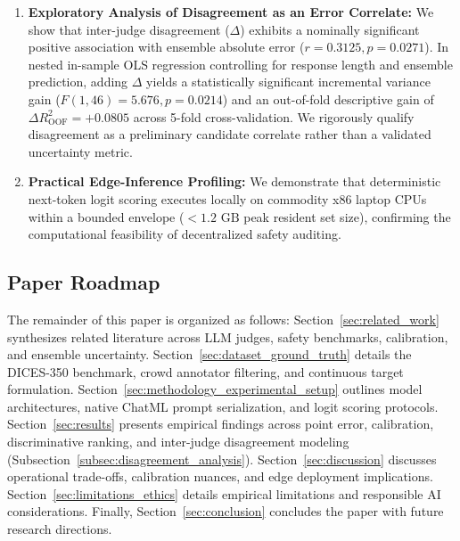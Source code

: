\begin{enumerate}
    \item \textbf{Exploratory Analysis of Disagreement as an Error Correlate:} We show that inter-judge disagreement ($\Delta$) exhibits a nominally significant positive association with ensemble absolute error ($r = 0.3125, p = 0.0271$). In nested in-sample OLS regression controlling for response length and ensemble prediction, adding $\Delta$ yields a statistically significant incremental variance gain ($F(1, 46) = 5.676, p = 0.0214$) and an out-of-fold descriptive gain of $\Delta R^2_{\text{OOF}} = +0.0805$ across 5-fold cross-validation. We rigorously qualify disagreement as a preliminary candidate correlate rather than a validated uncertainty metric.
    \item \textbf{Practical Edge-Inference Profiling:} We demonstrate that deterministic next-token logit scoring executes locally on commodity x86 laptop CPUs within a bounded envelope ($< 1.2\text{ GB}$ peak resident set size), confirming the computational feasibility of decentralized safety auditing.
\end{enumerate}

\subsection{Paper Roadmap}
\label{sec:roadmap}

The remainder of this paper is organized as follows: Section~\ref{sec:related_work} synthesizes related literature across LLM judges, safety benchmarks, calibration, and ensemble uncertainty. Section~\ref{sec:dataset_ground_truth} details the DICES-350 benchmark, crowd annotator filtering, and continuous target formulation. Section~\ref{sec:methodology_experimental_setup} outlines model architectures, native ChatML prompt serialization, and logit scoring protocols. Section~\ref{sec:results} presents empirical findings across point error, calibration, discriminative ranking, and inter-judge disagreement modeling (Subsection~\ref{subsec:disagreement_analysis}). Section~\ref{sec:discussion} discusses operational trade-offs, calibration nuances, and edge deployment implications. Section~\ref{sec:limitations_ethics} details empirical limitations and responsible AI considerations. Finally, Section~\ref{sec:conclusion} concludes the paper with future research directions.
